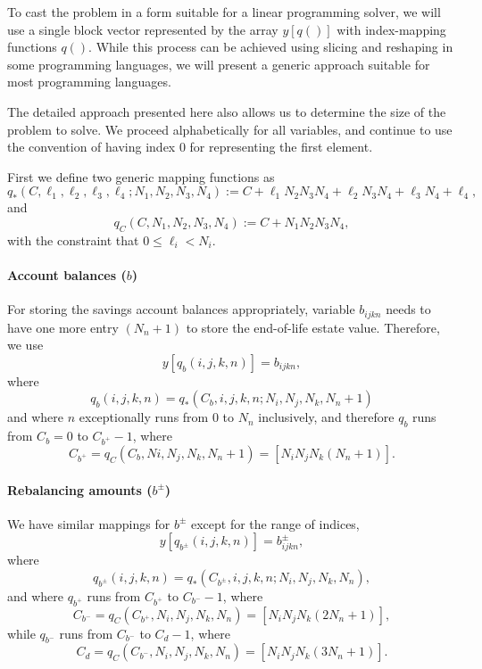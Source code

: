 \documentclass{report}[fleqn,12pt]
\begin{document}
To cast the problem in a form suitable for a linear programming solver, we will use
a single block vector represented by the array $y[q()]$ with index-mapping functions $q()$.
While this process can be achieved using slicing and reshaping in some programming
languages, we will present a generic approach suitable for most programming languages.

The detailed approach presented here also allows us to determine the size of the problem to solve.
We proceed alphabetically for all variables, and continue to use the convention of having
index 0 for representing the first element.

First we define two generic mapping functions as
\begin{equation}
	q_*(C, \ell_1, \ell_2, \ell_3, \ell_4; N_1, N_2, N_3, N_4) :=
	C + \ell_1N_2N_3N_4 + \ell_2N_3N_4 + \ell_3N_4 + \ell_4,
\end{equation}
and
\begin{equation}
	q_C(C, N_1, N_2, N_3, N_4) :=
	C + N_1N_2N_3N_4,
\end{equation}
with the constraint that $0 \le \ell_i < N_i$.

\paragraph*{Account balances (\boldmath$b$)}
For storing the savings account balances appropriately, variable $b_{ijkn}$ needs to have one
more entry $(N_n + 1)$ to
store the end-of-life estate value. Therefore, we use
\begin{equation}
	y[q_b(i, j, k, n)] = b_{ijkn},
\end{equation}
where
\begin{equation}
	\label{Eq:Extra}
	q_b(i, j, k, n) = q_*(C_b, i, j, k, n; N_i, N_j, N_k, N_n+1)
\end{equation}
and where $n$ exceptionally runs from 0 to $N_n$ inclusively, and therefore
$q_b$ runs from $C_b = 0$ to $C_{b^+} - 1$,
where
\[
	C_{b^+} = q_C(C_b, Ni, N_j, N_k, N_n+1) = [N_i N_j N_k (N_n+1)].
\]

\paragraph*{Rebalancing amounts (\boldmath$b^\pm$)}
We have similar mappings for $b^\pm$ except for the range of indices,
\begin{equation}
	y[q_{b^\pm}(i, j, k, n)] = b^\pm_{ijkn},
\end{equation}
where
\begin{equation}
	q_{b^\pm}(i, j, k, n) = q_*(C_{b^\pm}, i, j, k, n; N_i, N_j, N_k, N_n),
\end{equation}
and where
$q_{b^+}$ runs from $C_{b^+}$ to $C_{b^-} - 1$,
where
\[
	C_{b^-} = q_C(C_{b^+}, N_i, N_j, N_k, N_n) = [N_i N_j N_k (2N_n + 1)],
\]
while
$q_{b^-}$ runs from $C_{b^-}$ to $C_d - 1$, where
\[
	C_d = q_C(C_{b^-}, N_i, N_j, N_k, N_n) = [N_i N_j N_k  (3N_n + 1)].
\]
\end{document}
